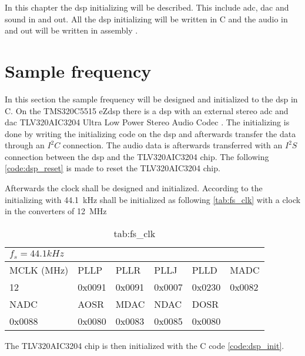 \label{ch:disinit}
In this chapter the \gls{dsp} initializing will be described. This include \gls{adc}, \gls{dac} and sound in and out. All the \gls{dsp} initializing will be written in C and the audio in and out will be written in assembly \citep{slaa557}. 

\section{Sample frequency}
In this section the sample frequency will be designed and initialized to the \gls{dsp} in C. 
On the TMS320C5515 eZdsp there is a \gls{dsp} with an external stereo \gls{adc} and \gls{dac} TLV320AIC3204 Ultra Low Power Stereo Audio Codec \citep{TLV320AIC3204}. The initializing is done by writing the initializing code on the \gls{dsp} and afterwards transfer the data through an $I^2C$ connection. The audio data is afterwards transferred with an $I^2S$ connection between the \gls{dsp} and the TLV320AIC3204 chip.
The following \autoref{code:dsp_reset} is made to reset the TLV320AIC3204 chip.


Afterwards the clock shall be designed and initialized. According to \citep{slaa557} the initializing with \SI{44.1}{\kilo\hertz} shall be initialized as following \autoref{tab:fs_clk} with a clock in the converters of \SI{12}{\mega\hertz}

\begin{table}[]
\centering
\caption{tab:fs_clk}
\label{tab:fs_clk}
\begin{tabular}{|l|l|l|l|l|l|}
\hline
\multicolumn{6}{|l|}{$f_s=44.1kHz$}           \\ \hline
MCLK (MHz) & PLLP & PLLR & PLLJ & PLLD & MADC \\ \hline
12         & 0x0091    & 0x0091    & 0x0007    & 0x0230  & 0x0082    \\ \hline
NADC       & AOSR & MDAC & NDAC & DOSR &      \\ \hline
0x0088          & 0x0080  & 0x0083    & 0x0085    & 0x0080  &      \\ \hline
\end{tabular}
\end{table}


The TLV320AIC3204 chip is then initialized with the C code  \autoref{code:dsp_init}.

